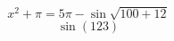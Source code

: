 \documentclass{article}
\newcommand{\Sin}[1]{\sin\left(#1\right)}
\begin{document}
$$x^2 + \pi = 5\pi - \sin\sqrt{100+12}$$
$$\Sin{123}$$
\end{document}
